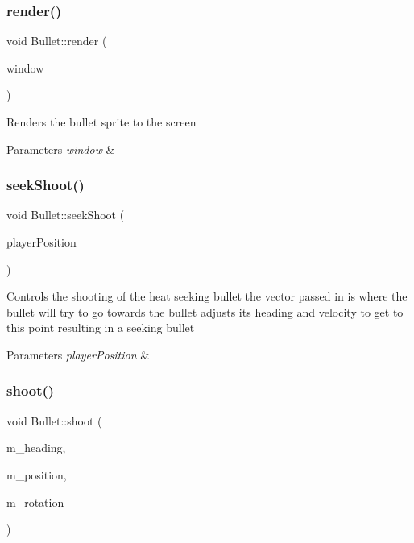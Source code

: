 \subsubsection{\texorpdfstring{render()}{render()}}
{\footnotesize\ttfamily void Bullet\+::render (\begin{DoxyParamCaption}\item[{sf\+::\+Render\+Window \&}]{window }\end{DoxyParamCaption})}



Renders the bullet sprite to the screen 


\begin{DoxyParams}{Parameters}
{\em window} & \\
\hline
\end{DoxyParams}
\mbox{\label{class_bullet_a7a61dfd6c3d2a192a1a2b1da7c808f71}} 
\subsubsection{\texorpdfstring{seekShoot()}{seekShoot()}}
{\footnotesize\ttfamily void Bullet\+::seek\+Shoot (\begin{DoxyParamCaption}\item[{sf\+::\+Vector2f}]{player\+Position }\end{DoxyParamCaption})}



Controls the shooting of the heat seeking bullet the vector passed in is where the bullet will try to go towards the bullet adjusts its heading and velocity to get to this point resulting in a seeking bullet 


\begin{DoxyParams}{Parameters}
{\em player\+Position} & \\
\hline
\end{DoxyParams}
\mbox{\label{class_bullet_ae321c1bab25a1a9d2d9fedbdafbed2bc}} 
\subsubsection{\texorpdfstring{shoot()}{shoot()}}
{\footnotesize\ttfamily void Bullet\+::shoot (\begin{DoxyParamCaption}\item[{sf\+::\+Vector2f}]{m\+\_\+heading,  }\item[{sf\+::\+Vector2f}]{m\+\_\+position,  }\item[{float}]{m\+\_\+rotation }\end{DoxyParamCaption})}



